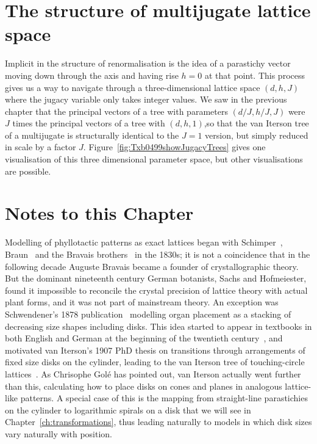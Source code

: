 \section{The structure of multijugate lattice space}
\label{sec:Jlattice}
Implicit in the structure of renormalisation is the idea of a parastichy vector moving down through the axis and having rise $h=0$ at that point. This process gives us a way to navigate through a three-dimensional lattice space $(d,h,J)$ where the jugacy variable only takes integer values. We saw in the previous chapter that the principal vectors of a tree with parameters $(d/J,h/J,J)$ were $J$ times the principal vectors of a tree with $(d,h,1)$,so that the van Iterson tree of a multijugate is structurally identical to the $J=1$ version, but simply reduced in scale by a factor $J$.  Figure~\ref{fig:Txb0499showJugacyTrees} gives one visualisation of this three dimensional parameter space, but other visualisations are possible. 

\section{Notes to this Chapter}%

Modelling of phyllotactic patterns as exact lattices began with Schimper~\cite{schimperBeschreibungSymphytumZeyheri1835}, Braun~\cite{braunBetrachtungenUeberErscheinung1851} and the Bravais brothers~\cite{bravaisEssaiDispositionFeuilles1837} in the 1830s; it is not a coincidence that in the following decade Auguste Bravais became a founder of crystallographic theory. But the dominant nineteenth century German botanists, Sachs and Hofmeiester, found it impossible to reconcile the crystal precision of lattice theory with actual plant forms, and it was not part of mainstream theory. An exception was Schwendener's 1878 publication~\cite{schwendenerMechanischeTheorieBlattstellungen1878} modelling organ placement as a stacking of decreasing size shapes including disks.
This idea started to appear in textbooks in both English and German at the beginning of the twentieth century~\cite{weisseSketchMechanicalHypothesis1900}, and motivated van Iterson's 1907 PhD thesis on transitions through arrangements of fixed size disks on the cylinder, leading to the van Iterson tree of touching-circle lattices~\cite{vanitersonjrMathematischeUndMikroscopischAnatomische1907}. 
As Chrisophe Golé has pointed out, van Iterson actually went further than this, calculating how to place disks on cones and planes in analogous lattice-like patterns. A special case of this is the mapping from straight-line parastichies on the cylinder to logarithmic spirals on a disk that we will see in Chapter~\ref{ch:transformations}, thus leading naturally to models in which disk sizes vary naturally with position. 

